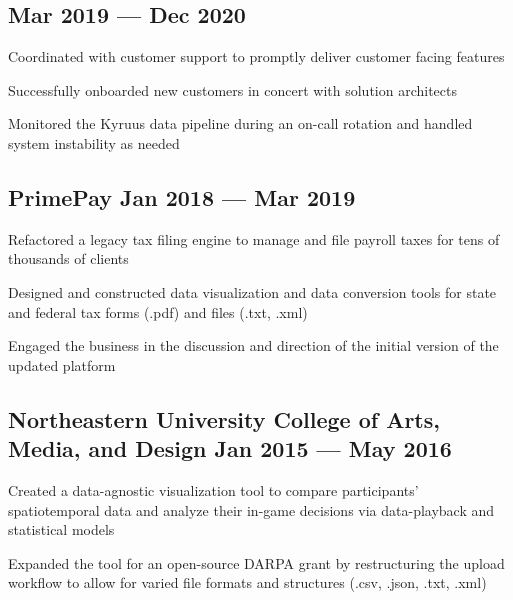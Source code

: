 \subsection{{\hfill Mar 2019 --- Dec 2020}}
\begin{zitemize}
\item Coordinated with customer support to promptly deliver customer facing features
\item Successfully onboarded new customers in concert with solution architects
\item Monitored the Kyruus data pipeline during an on-call rotation and handled system instability as needed
\end{zitemize}

\subsection{{PrimePay \hfill Jan 2018 --- Mar 2019}}
\begin{zitemize}
\item Refactored a legacy tax filing engine to manage and file payroll taxes for tens of thousands of clients
\item Designed and constructed data visualization and data conversion tools for state and federal tax forms (.pdf) and files (.txt, .xml)
\item Engaged the business in the discussion and direction of the initial version of the updated platform
\end{zitemize}

\subsection{{Northeastern University College of Arts, Media, and Design \hfill Jan 2015 --- May 2016}}
\begin{zitemize}
\item Created a data-agnostic visualization tool to compare participants' spatiotemporal data and analyze their in-game decisions via data-playback and statistical models
\item Expanded the tool for an open-source DARPA grant by restructuring the upload workflow to allow for varied file formats and structures (.csv, .json, .txt, .xml)
\end{zitemize}

